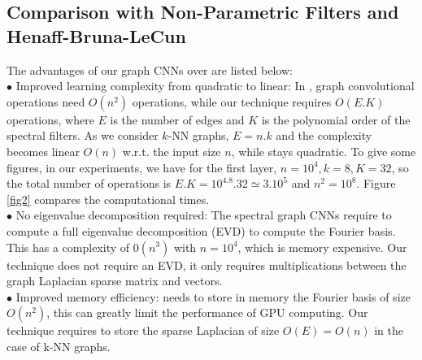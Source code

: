 \documentclass{article}
\begin{document}
\subsection{Comparison with Non-Parametric Filters and Henaff-Bruna-LeCun \cite{art:HenaffBrunaLeCun15DLgraphs}}
\vspace{-0.2cm}
The advantages of our graph CNNs over \cite{art:HenaffBrunaLeCun15DLgraphs} are listed below:\\
$\bullet$ Improved learning complexity from quadratic to linear: In \cite{art:HenaffBrunaLeCun15DLgraphs}, graph convolutional operations need $O(n^2)$ operations, while our technique requires $O(E.K)$ operations, where $E$ is the number of edges and $K$ is the polynomial order of the spectral filters. As we consider $k$-NN graphs, $E=n.k$ and the complexity becomes linear $O(n)$ w.r.t. the input size $n$, while  \cite{art:HenaffBrunaLeCun15DLgraphs} stays quadratic. To give some figures, in our experiments, we have for the first layer, $n=10^4, k=8, K=32$, so the total number of operations is $E.K=10^4.8.32 \simeq 3.10^5$ and $n^2=10^8$. Figure \ref{fig2} compares the computational times.\\
$\bullet$  No eigenvalue decomposition required: The spectral graph CNNs \cite{art:HenaffBrunaLeCun15DLgraphs} require to compute a full eigenvalue decomposition (EVD) to compute the Fourier basis. This has a complexity of $0(n^3)$ with $n=10^{4}$, which is memory expensive. Our technique does not require an EVD, it only requires multiplications between the graph Laplacian sparse matrix and vectors. \\
$\bullet$ Improved memory efficiency: \cite{art:HenaffBrunaLeCun15DLgraphs} needs to store in memory the Fourier basis of size $O(n^2)$, this can greatly limit the performance of GPU computing. Our technique requires to store the sparse Laplacian of size $O(E)=O(n)$ in the case of k-NN graphs.





\end{document}
